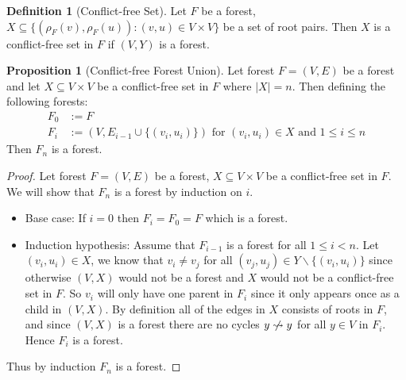 \documentclass[a4paper,12pt]{article}
\theoremstyle{definition}
\newtheorem{definition}{Definition}[section]
\newtheorem{proposition}{Proposition}[section]
\begin{document}
\begin{definition}[Conflict-free Set]
    Let $F$ be a forest, $X \subseteq \{(\rho_F(v), \rho_F(u)) : (v, u) \in V
    \times V\}$ be a set of root pairs. Then $X$ is a conflict-free set in $F$
    if $(V, Y)$ is a forest.
\end{definition}

\begin{proposition}[Conflict-free Forest Union]\label{prop:conflict-free-forest-union}
    Let forest $F = (V, E)$ be a forest and let $X \subseteq V \times V$ be a
    conflict-free set in $F$ where $|X| = n$. Then defining the following forests:
    \begin{align*}
        F_0 &:= F \\
        F_{i} &:= (V, E_{i - 1} \cup \{(v_i, u_i)\}) \text{ for } (v_i, u_i) \in X \text{ and } 1 \leq i \leq n
    \end{align*}
    Then $F_n$ is a forest.
\end{proposition}

\begin{proof}
    Let forest $F = (V, E)$ be a forest, $X \subseteq V \times V$ be a
    conflict-free set in $F$. We will show that $F_n$ is a forest by induction
    on $i$.
    \begin{itemize}
        \item Base case: If $i = 0$ then $F_i = F_0 = F$ which is a forest.
        \item Induction hypothesis: Assume that $F_{i - 1}$ is a forest for all
        $1 \leq i < n$.  Let $(v_i, u_i) \in X$, we know that $v_i \neq v_j$ for
        all $(v_j, u_j) \in Y \backslash \{(v_i, u_i)\}$ since otherwise $(V,
        X)$ would not be a forest and $X$ would not be a conflict-free set in
        $F$. So $v_i$ will only have one parent in $F_i$ since it only appears
        once as a child in $(V, X)$. By definition all of the edges in $X$
        consists of roots in $F$, and since $(V, X)$ is a forest there are no
        cycles $y \centernot\leadsto y$ for all $y \in V$ in $F_i$. Hence $F_i$
        is a forest.
    \end{itemize}
    Thus by induction $F_n$ is a forest.
\end{proof}
\end{document}
